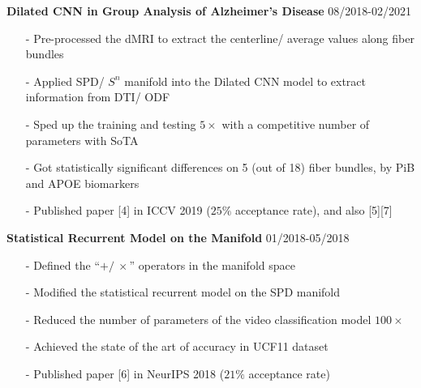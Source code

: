 \documentclass[margin]{res}
\begin{document}
\begin{resume}
                \textbf{Dilated CNN in Group Analysis of Alzheimer's Disease} \hfill 08/2018-02/2021
                \begin{itemize}\itemsep -2.2pt %
                 \item[-] Pre-processed the dMRI to extract the centerline/ average values along fiber bundles
                 \item[-] Applied SPD/ $S^n$ manifold into the Dilated CNN model to extract information from DTI/ ODF
                 \item[-] Sped up the training and testing $5\times$ with a competitive number of parameters with SoTA
                 \item[-] Got statistically significant differences on 5 (out of 18) fiber bundles, by PiB and APOE biomarkers
                 \item[-] Published paper [4] in ICCV 2019 ($25\%$ acceptance rate), and also [5][7]
                 \end{itemize}

                 \vspace{-1em}  

                 \textbf{Statistical Recurrent Model on the Manifold} \hfill 01/2018-05/2018
                \begin{itemize}\itemsep -2.2pt %
                 \item[-] Defined the ``$+/\ \times$'' operators in the manifold space
                 \item[-] Modified the statistical recurrent model on the SPD manifold
                 \item[-] Reduced the number of parameters of the video classification model $100\times$
                 \item[-] Achieved the state of the art of accuracy in UCF11 dataset
                 \item[-] Published paper [6] in NeurIPS 2018 ($21\%$ acceptance rate)
                 \end{itemize}



\end{resume}
\end{document}
